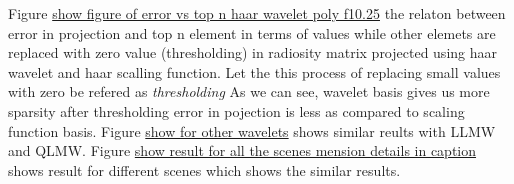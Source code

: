 Figure \underline{show figure of error vs top n haar wavelet poly f10.25} the relaton between error in projection and top n element in terms of values while other elemets are replaced with zero value (thresholding) in radiosity matrix projected using haar wavelet and haar scalling function. Let the this process of replacing small values with zero be refered as {\em thresholding} As we can see, wavelet basis gives us more sparsity after thresholding error in pojection is less as compared to scaling function basis. Figure \underline{show for other wavelets} shows similar reults with LLMW and QLMW. Figure \underline{show result for all the scenes mension details in caption} shows result for different scenes which shows the similar results.
% 














